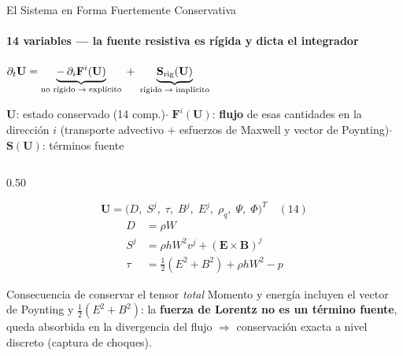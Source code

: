\documentclass[aspectratio=169,9pt]{beamer}
\begin{document}
\begin{frame}{El Sistema en Forma Fuertemente Conservativa}
\framesubtitle{14 variables --- la fuente resistiva es r\'igida y dicta el integrador}
\vspace{-0.12cm}
\begin{center}
  $\displaystyle
   \partial_t\mathbf U
   =\underbrace{-\,\partial_i\mathbf F^i(\mathbf U)}_{\text{no r\'igido}\;\to\;\text{expl\'icito}}
   \;+\;\underbrace{\mathbf S_{\rm rig}(\mathbf U)}_{\text{r\'igido}\;\to\;\text{impl\'icito}}$
\end{center}
\vspace{-0.16cm}
\begin{center}
  {\scriptsize\color{INF2}%
   $\mathbf U$: estado conservado (14 comp.)\quad$\cdot$\quad
   $\mathbf F^i(\mathbf U)$: \textbf{flujo} de esas cantidades en la
   direcci\'on $i$ (transporte advectivo $+$ esfuerzos de Maxwell y
   vector de Poynting)\quad$\cdot$\quad
   $\mathbf S(\mathbf U)$: t\'erminos fuente}
\end{center}
\vspace{-0.18cm}
\pause
\begin{columns}[T]
\begin{column}{0.50\textwidth}
  \begin{tcolorbox}[EQ={Vector de estado (variables \emph{totales})}]
    \scriptsize
    \[
      \mathbf{U}=\bigl(D,\;S^j,\;\tau,\;B^j,\;E^j,\;\rho_q,\;\Psi,\;\Phi\bigr)^{T}
      \quad(14)
    \]
    \vspace{-0.35cm}
    \begin{align*}
      D &= \rho W\\
      S^j &= \rho h W^2 v^j+(\mathbf{E}\times\mathbf{B})^j\\
      \tau &= \tfrac12\!\left(E^2+B^2\right)+\rho h W^2-p
    \end{align*}
  \end{tcolorbox}
  \pause\vspace{0.08cm}
  \begin{block}{Consecuencia de conservar el tensor \emph{total}}
    \scriptsize
    Momento y energ\'ia incluyen el vector de Poynting y
    $\tfrac12(E^2+B^2)$: la \textbf{fuerza de Lorentz no es un t\'ermino
    fuente}, queda absorbida en la divergencia del flujo
    $\Rightarrow$ conservaci\'on exacta a nivel discreto (captura de choques).

\end{block}
\end{column}
\end{columns}
\end{frame}
\end{document}
